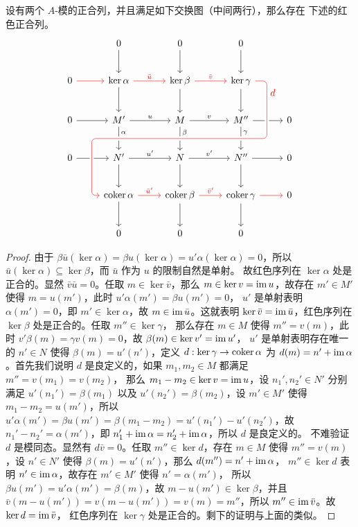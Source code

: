 \begin{proposition}[蛇引理]
  设有两个 $A$-模的正合列，并且满足如下交换图（中间两行），那么存在
  下述的红色正合列。
  \[
    \begin{tikzcd}[sep=2.4em]
      & 0\arrow[d] & 0\arrow[d]& 0\arrow[d] &\\
      0\arrow[r,red] & \ker\alpha\arrow[r,red,"\bar u"]\arrow[d] & \ker\beta\arrow[r,red,"\bar v"]\arrow[d] 
      & \ker\gamma \arrow[d]\\
      0\arrow[r] & M'\arrow[r,"u"]\arrow[d,"\alpha"{near start}] & M\arrow[r,"v"]\arrow[d,phantom,""{coordinate,name=O}] 
      \arrow[d,"\beta"{near start}] 
      & M''\arrow[r]\arrow[d,"\gamma"{near start}] & 0\\
      0\arrow[r] & N'\arrow[r,"u'"]\arrow[d] & N\arrow[r,"v'"]\arrow[d] & N''\arrow[r]\arrow[d] & 0\\
      & \coker\alpha\arrow[r,red,"\bar u'"]
      \arrow[uuurr,
        red,
        crossing over clearance=1ex,
        leftarrow,
        rounded corners,
        crossing over,
        to path={ 
          -- ([xshift=-.8em]\tikztostart.west)
          |- (O)[near end]\tikztonodes
          -| node[right,pos=0.9]{$d$} ([xshift=1.2em]\tikztotarget.east)
          -- (\tikztotarget)
        }
      ]\arrow[d] & \coker\beta\arrow[r,red,"\bar v'"]\arrow[d] & \coker\gamma\arrow[r,red]\arrow[d] & 0\\
      & 0 & 0 & 0 &
    \end{tikzcd}  
  \]
\end{proposition}
\begin{proof}
  由于 $\beta\bar u(\ker\alpha)=\beta u(\ker\alpha)=u'\alpha(\ker\alpha)=0$，所以
  $\bar u(\ker\alpha)\subseteq\ker\beta$，而 $\bar u$ 作为 $u$ 的限制自然是单射。
  故红色序列在 $\ker\alpha$ 处是正合的。显然 $\bar v\bar u=0$。任取 $m\in\ker\bar v$，那么
  $m\in\ker v=\operatorname{im} u$，故存在 $m'\in M'$ 使得 $m=u(m')$，此时 $u'\alpha(m')=\beta u(m')=0$，
  $u'$ 是单射表明 $\alpha(m')=0$，即 $m'\in\ker\alpha$，故 $m\in\operatorname{im}\bar u$。这就表明
  $\ker\bar v=\operatorname{im}\bar u$，红色序列在 $\ker\beta$ 处是正合的。任取 $m''\in\ker\gamma$，
  那么存在 $m\in M$ 使得 $m''=v(m)$，此时 $v'\beta(m)=\gamma v(m)=0$，故 $\beta(m)\in\ker v'=\operatorname{im} u'$，
  $u'$ 是单射表明存在唯一的 $n'\in N$ 使得 $\beta(m)=u'(n')$，定义 $d:\ker\gamma\to\operatorname{coker}\alpha$ 为
  $d(m)=n'+\operatorname{im}\alpha$。首先我们说明 $d$ 是良定义的，如果 $m_1,m_2\in M$ 都满足 $m''=v(m_1)=v(m_2)$，
  那么 $m_1-m_2\in\ker v=\operatorname{im} u$，设 $n_1',n_2'\in N'$ 分别满足 $u'(n_1')=\beta(m_1)$ 以及
  $u'(n_2')=\beta(m_2)$，设 $m'\in M'$ 使得 $m_1-m_2=u(m')$，所以 
  $u'\alpha(m')=\beta u(m')=\beta(m_1-m_2)=u'(n_1')-u'(n_2')$，故
  $n_1'-n_2'=\alpha(m')$，即 $n_1'+\operatorname{im}\alpha=n_2'+\operatorname{im}\alpha$，所以 $d$ 是良定义的。
  不难验证 $d$ 是模同态。显然有 $d\bar v=0$。任取 $m''\in\ker d$，存在 $m\in M$
  使得 $m''=v(m)$，设 $n'\in N'$ 使得 $\beta(m)=u'(n')$，那么 $d(m'')=n'+\operatorname{im}\alpha$，
  $m''\in\ker d$ 表明 $n'\in\operatorname{im}\alpha$，故存在 $m'\in M'$ 使得 $n'=\alpha(m')$，
  所以 $\beta u(m')=u'\alpha(m')=\beta(m)$，故 $m-u(m')\in\ker\beta$，并且
  $\bar v(m-u(m'))=v(m-u(m'))=v(m)=m''$，所以 $m''\in\operatorname{im}\bar v$。故 $\ker d=\operatorname{im}\bar v$，
  红色序列在 $\ker\gamma$ 处是正合的。剩下的证明与上面的类似。 
\end{proof}

